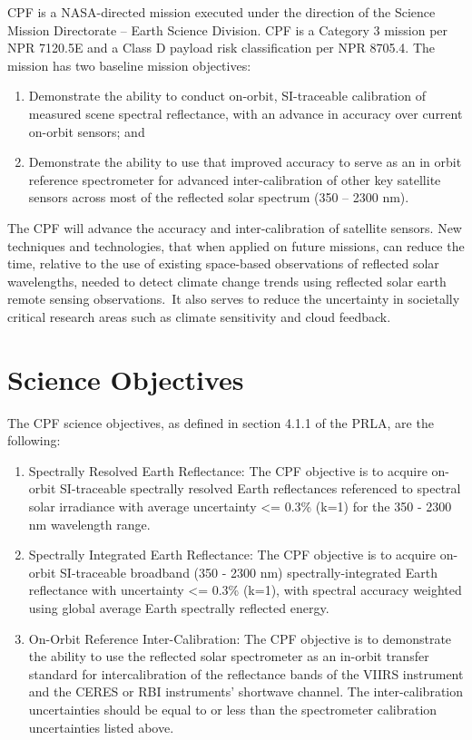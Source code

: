 \documentclass[12pt,oneside,oldfontcommands]{memoir}
\begin{document}
\gls{CPF} is a NASA-directed mission executed under the direction of the Science Mission Directorate – Earth Science Division. \gls{CPF} is a Category 3 mission per NPR 7120.5E and a Class D payload risk classification per NPR 8705.4. The mission has two baseline mission objectives:

\begin{enumerate}
\item{} Demonstrate the ability to conduct on-orbit, \gls{SI}-traceable calibration of \gls{measure}d scene spectral reflectance, with an advance in accuracy over current on-orbit sensors; and

\item{} Demonstrate the ability to use that improved accuracy to serve as an in orbit reference spectrometer for advanced inter-calibration of other key satellite sensors across most of the reflected solar spectrum (350 – 2300 nm).

\end{enumerate}

The \gls{CPF} will advance the accuracy and inter-calibration of satellite sensors. New techniques and technologies, that when applied on future missions, can reduce the time, relative to the use of existing space-based observations of reflected solar wavelengths, needed to detect climate change trends using reflected solar earth remote sensing observations. It also serves to reduce the uncertainty in societally critical research areas such as climate sensitivity and cloud feedback.

\section{Science Objectives }
\label{scienceobjectives}

The \gls{CPF} science objectives, as defined in section 4.1.1 of the PRLA, are the following:

\begin{enumerate}
\item{} Spectrally Resolved Earth Reflectance: The \gls{CPF} objective is to acquire on-orbit \gls{SI}-traceable spectrally resolved Earth reflectances referenced to spectral solar irradiance with average uncertainty <= 0.3\% (k=1) for the 350 - 2300 nm wavelength range.

\item{} Spectrally Integrated Earth Reflectance: The \gls{CPF} objective is to acquire on-orbit \gls{SI}-traceable broadband (350 - 2300 nm) spectrally-integrated Earth reflectance with uncertainty <= 0.3\% (k=1), with spectral accuracy weighted using global average Earth spectrally reflected energy.

\item{} On-Orbit Reference Inter-Calibration: The \gls{CPF} objective is to demonstrate the ability to use the reflected solar spectrometer as an in-orbit transfer standard for intercalibration of the reflectance bands of the \gls{VIIRS} instrument and the \gls{CERES} or \gls{RBI} instruments' shortwave channel. The inter-calibration uncertainties should be equal to or less than the spectrometer calibration uncertainties listed above.

\end{enumerate}
\end{document}
